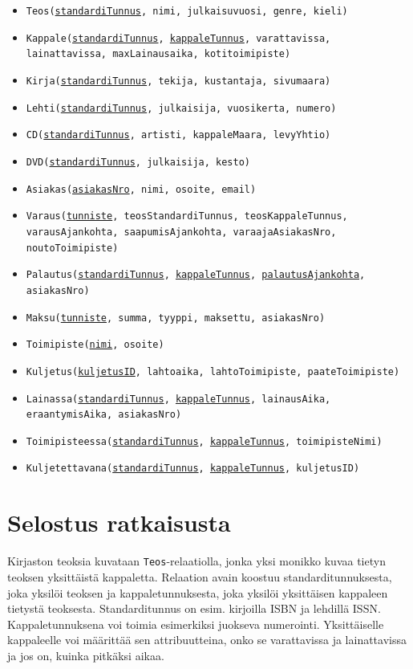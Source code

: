 \documentclass[12pt,titlepage] {article}
\begin{document}
\begin{itemize}
	\item \texttt{Teos(\underline{standardiTunnus}, nimi, julkaisuvuosi, genre, kieli)}
	\item \texttt{Kappale(\underline{standardiTunnus}, \underline{kappaleTunnus}, varattavissa, lainattavissa, maxLainausaika, kotitoimipiste)}
	\item \texttt{Kirja(\underline{standardiTunnus}, tekija, kustantaja, sivumaara)}
	\item \texttt{Lehti(\underline{standardiTunnus}, julkaisija, vuosikerta, numero)}
	\item \texttt{CD(\underline{standardiTunnus}, artisti, kappaleMaara, levyYhtio)}
	\item \texttt{DVD(\underline{standardiTunnus}, julkaisija, kesto)}
	\item \texttt{Asiakas(\underline{asiakasNro}, nimi, osoite, email)}
	\item \texttt{Varaus(\underline{tunniste}, teosStandardiTunnus, teosKappaleTunnus, varausAjankohta, saapumisAjankohta, varaajaAsiakasNro, noutoToimipiste)}
	\item \texttt{Palautus(\underline{standardiTunnus}, \underline{kappaleTunnus}, \underline{palautusAjankohta}, asiakasNro)}
	\item \texttt{Maksu(\underline{tunniste}, summa, tyyppi, maksettu, asiakasNro)}
	\item \texttt{Toimipiste(\underline{nimi}, osoite)}
	\item \texttt{Kuljetus(\underline{kuljetusID}, lahtoaika, lahtoToimipiste, paateToimipiste)}
\end{itemize}

\begin{itemize}
	\item \texttt{Lainassa(\underline{standardiTunnus}, \underline{kappaleTunnus}, lainausAika, eraantymisAika, asiakasNro)}
	\item \texttt{Toimipisteessa(\underline{standardiTunnus}, \underline{kappaleTunnus}, toimipisteNimi)}
	\item \texttt{Kuljetettavana(\underline{standardiTunnus}, \underline{kappaleTunnus}, kuljetusID)}
\end{itemize}

\section {Selostus ratkaisusta}

Kirjaston teoksia kuvataan \texttt{Teos}-relaatiolla, jonka yksi monikko kuvaa tietyn teoksen yksittäistä kappaletta. Relaation avain koostuu standarditunnuksesta, joka yksilöi teoksen ja kappaletunnuksesta, joka yksilöi yksittäisen kappaleen tietystä teoksesta. Standarditunnus on esim. kirjoilla ISBN ja lehdillä ISSN. Kappaletunnuksena voi toimia esimerkiksi juokseva numerointi. Yksittäiselle kappaleelle voi määrittää sen attribuutteina, onko se varattavissa ja lainattavissa ja jos on, kuinka pitkäksi aikaa.
\end{document}
